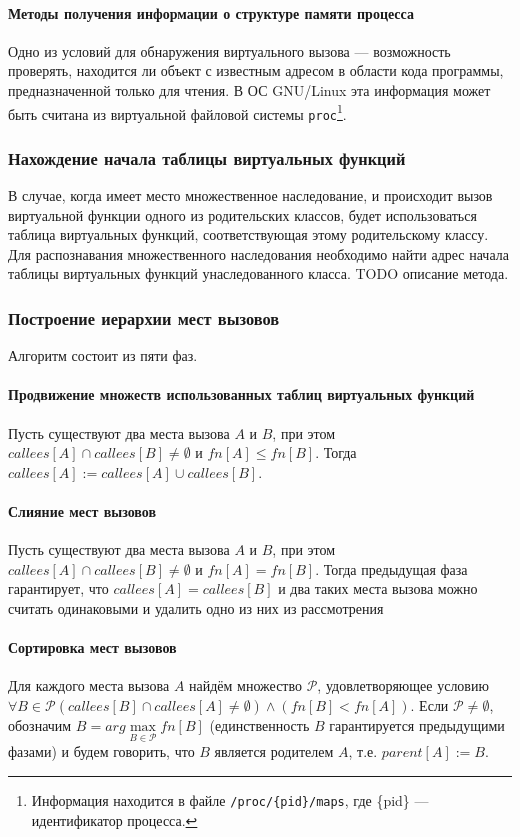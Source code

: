 \documentclass[a4paper,12pt,russian]{article}
\begin{document}
\paragraph{Методы получения информации о структуре памяти процесса}
Одно из условий для обнаружения виртуального вызова --- возможность проверять, находится ли объект с известным адресом в области кода программы, предназначенной только для чтения.
В ОС GNU/Linux эта информация может быть считана из виртуальной файловой системы \texttt{proc}\footnote{Информация находится в файле \texttt{/proc/\{pid\}/maps}, где \{pid\} --- идентификатор процесса.}.

\subsubsection{Нахождение начала таблицы виртуальных функций}
В случае, когда имеет место множественное наследование, и происходит вызов виртуальной функции одного из родительских классов, будет использоваться таблица виртуальных функций, соответствующая этому родительскому классу.
Для распознавания множественного наследования необходимо найти адрес начала таблицы виртуальных функций унаследованного класса. TODO описание метода.
\subsubsection{Построение иерархии мест вызовов}

Алгоритм состоит из пяти фаз.
\paragraph{Продвижение множеств использованных таблиц виртуальных функций}
Пусть существуют два места вызова $A$ и $B$, при этом $callees[A] \cap callees[B] \neq \emptyset$ и $fn[A] \leq fn[B]$.
Тогда $callees[A] := callees[A] \cup callees[B]$.
\paragraph{Слияние мест вызовов}
Пусть существуют два места вызова $A$ и $B$, при этом $callees[A] \cap callees[B] \neq \emptyset$ и $fn[A] = fn[B]$.
Тогда предыдущая фаза гарантирует, что $callees[A] = callees[B]$ и два таких места вызова можно считать одинаковыми и удалить одно из них из рассмотрения
\paragraph{Сортировка мест вызовов}
Для каждого места вызова $A$ найдём множество $\mathcal{P}$, удовлетворяющее условию $\forall B \in \mathcal{P} (callees[B] \cap callees[A] \neq \emptyset) \wedge (fn[B] < fn[A])$.
Если $\mathcal{P} \neq \emptyset$, обозначим $B = arg \max\limits_{B \in \mathcal{P}}fn[B]$ (единственность $B$ гарантируется предыдущими фазами) и будем говорить, что $B$ является родителем $A$, т.е. $parent[A] := B$.
\end{document}
